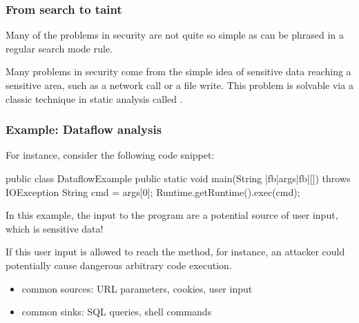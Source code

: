 \documentclass[aspectratio=169, handout]{beamer}
\begin{document}
\begin{frame}[fragile]
  \frametitle{From search to taint}

  Many of the problems in security are not quite so simple as can be phrased in
  a regular search mode rule.

  \pause
  \vspace{\fill}

  Many problems in security come from the simple idea of sensitive data reaching
  a sensitive area, such as a network call or a file write. This problem is solvable
  via a classic technique in static analysis called .

  \pause
  \vspace{\fill}

\end{frame}

\begin{frame}[fragile]
  \frametitle{Example: Dataflow analysis}

  For instance, consider the following code snippet:

  \begin{pythoncodeblock}[language=java]
    public class DataflowExample {
      public static void main(String |fb|args|fb|[]) throws IOException {
        String cmd = args[0];
        Runtime.getRuntime().exec(cmd);
      }
    }
  \end{pythoncodeblock}

  \pause
  \vspace{\fill}

  In this example, the input  to the program are a potential
  {\color{sourceColor}source} of user input, which is sensitive data!

  \pause
  \vspace{\fill}

  If this user input is allowed to reach the  method, for instance,
  an attacker could potentially cause dangerous arbitrary code execution.

  \pause
  \vspace{\fill}

  \begin{itemize}
    \item common sources: URL parameters, cookies, user input
    \item common sinks: SQL queries, shell commands
  \end{itemize}
\end{frame}
\end{document}
